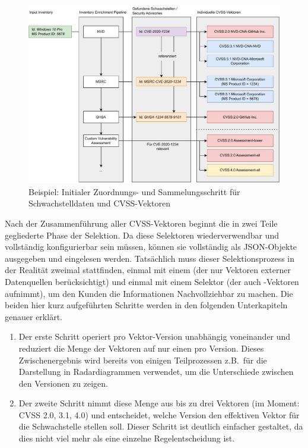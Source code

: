 \begin{figure}[htbp] %
    \centering
    \includegraphics[width=1\textwidth, keepaspectratio]{res/grafiken/cvss-selection-process-collection}
    \caption{Beispiel: Initialer Zuordnungs- und Sammelungsschritt für Schwachstelldaten und CVSS-Vektoren}
    \label{fig:cvss-selection-process-collection}
\end{figure}

Nach der Zusammenführung aller CVSS-Vektoren beginnt die in zwei Teile gegliederte Phase der Selektion.
Da diese Selektoren wiederverwendbar und vollständig konfigurierbar sein müssen, können sie vollständig als JSON-Objekte ausgegeben und eingelesen werden.
Tatsächlich muss dieser Selektionsprozess in der Realität zweimal stattfinden, einmal mit einem  (der nur Vektoren externer Datenquellen berücksichtigt) und einmal mit einem  Selektor (der auch -Vektoren aufnimmt), um den Kunden die Informationen Nachvollziehbar zu machen.
Die beiden hier kurz aufgeführten Schritte werden in den folgenden Unterkapiteln genauer erklärt.

\begin{enumerate}
    \item
    Der erste Schritt operiert pro Vektor-Version unabhängig voneinander und reduziert die Menge der Vektoren auf nur einen pro Version.
    Dieses Zwischenergebnis wird bereits von einigen Teilprozessen z.B.\ für die Darstellung in Radardiagrammen verwendet, um die Unterschiede zwischen den Versionen zu zeigen.
    \item
    Der zweite Schritt nimmt diese Menge aus bis zu drei Vektoren (im Moment: CVSS 2.0, 3.1, 4.0) und entscheidet, welche Version den effektiven Vektor für die Schwachstelle stellen soll.
    Dieser Schritt ist deutlich einfacher gestaltet, da dies nicht viel mehr als eine einzelne Regelentscheidung ist.
\end{enumerate}

